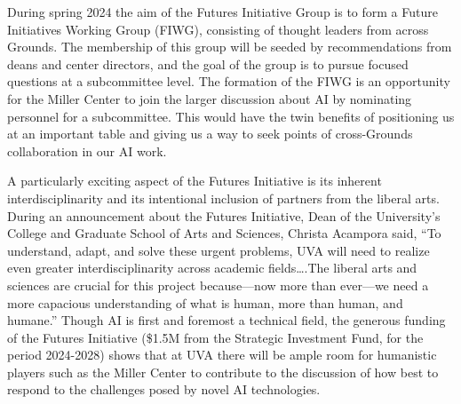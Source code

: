 \documentclass[12pt, oneside]{article}   	%
\begin{document}
During spring 2024 the aim of the Futures Initiative Group is to form a Future Initiatives Working Group (FIWG), consisting of thought leaders from across Grounds.  The membership of this group will be seeded by recommendations from deans and center directors, and the goal of the group is to pursue focused questions at a subcommittee level.  The formation of the FIWG is an opportunity for the Miller Center to join the larger discussion about AI by nominating personnel for a subcommittee.  This would have the twin benefits of positioning us at an important table and giving us a way to seek points of cross-Grounds collaboration in our AI work.

A particularly exciting aspect of the Futures Initiative is its inherent interdisciplinarity and its intentional inclusion of partners from the liberal arts.  During an announcement about the Futures Initiative, Dean of the University’s College and Graduate School of Arts and Sciences, Christa Acampora said, “To understand, adapt, and solve these urgent problems, UVA will need to realize even greater interdisciplinarity across academic fields….The liberal arts and sciences are crucial for this project because—now more than ever—we need a more capacious understanding of what is human, more than human, and humane.”  Though AI is first and foremost a technical field, the generous funding of the Futures Initiative (\$1.5M from the Strategic Investment Fund, for the period 2024-2028) shows that at UVA there will be ample room for humanistic players such as the Miller Center to contribute to the discussion of how best to respond to the challenges posed by novel AI technologies.
\end{document}
